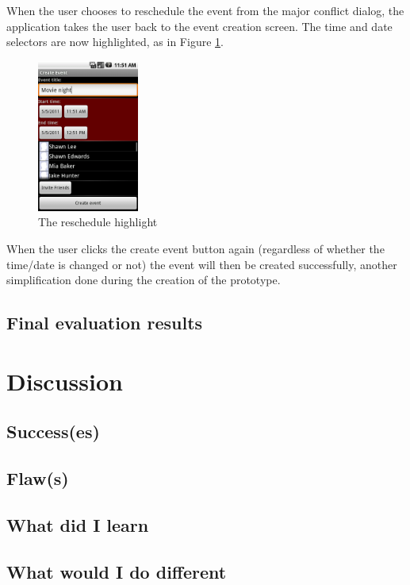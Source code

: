 \documentclass[]{report}
\begin{document}
When the user chooses to reschedule the event from the major conflict dialog,
the application takes the user back to the event creation screen. The time and
date selectors are now highlighted, as in Figure \ref{fig:reschedule}.

\begin{figure}[htb]
  \centering
  \includegraphics[height=50mm]{reschedule}
  \caption{The reschedule highlight}
  \label{fig:reschedule}
\end{figure}

When the user clicks the create event button again (regardless of whether the
time/date is changed or not) the event will then be created successfully,
another simplification done during the creation of the prototype.

\section{Final evaluation results}



\chapter{Discussion}

\section{Success(es)}

\section{Flaw(s)}

\section{What did I learn}

\section{What would I do different}
\end{document}
